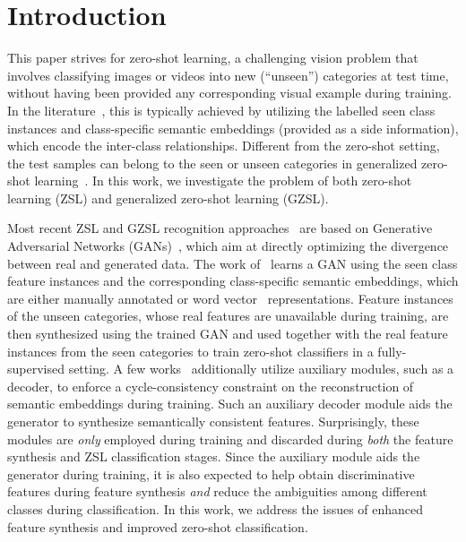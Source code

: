 \documentclass[runningheads]{llncs}
\begin{document}
\section{Introduction}


This paper strives for zero-shot learning, a challenging vision problem that involves classifying images or videos into new (\enquote{unseen}) categories at test time, without having been provided any corresponding visual example during training. In the literature~\cite{akata15label,romera15icml,Ye17cvpr,Xian18cvpr}, this is typically achieved by utilizing the labelled seen class instances and class-specific semantic embeddings (provided as a side information), which encode the inter-class relationships. Different from the zero-shot setting, the test samples can belong to the seen or unseen categories in generalized zero-shot learning~\cite{zsl-good-bad-ugly}. In this work, we investigate the problem of both zero-shot learning (ZSL) and generalized zero-shot learning (GZSL).


Most recent ZSL and GZSL recognition approaches~\cite{Xian18cvpr,Rafael18eccv,Xian19cvpr,huang19generative,li19leveraging} are based on Generative Adversarial Networks (GANs)~\cite{GAN}, which aim at directly optimizing the divergence between real and generated data. The work of~\cite{Xian18cvpr} learns a GAN using the seen class feature instances and the corresponding class-specific semantic embeddings, which are either manually annotated or word vector~\cite{mikolov13w2v} representations. 
Feature instances of the unseen categories, whose real features are unavailable during training, are then synthesized using the trained GAN and used together with the real feature instances from the seen categories to train zero-shot classifiers in a fully-supervised setting. 
A few works~\cite{Rafael18eccv,huang19generative,Mandal19cvpr} additionally utilize auxiliary modules, such as a decoder, to enforce a cycle-consistency constraint on the reconstruction of semantic embeddings during training. Such an auxiliary decoder module aids the generator to synthesize semantically consistent features.
Surprisingly, these modules are \textit{only} employed during training and discarded during \textit{both} the feature synthesis and ZSL classification stages. Since the auxiliary module aids the generator during training, it is also expected to help obtain discriminative features during feature synthesis \textit{and} reduce the ambiguities among different classes during classification. In this work, we address the issues of enhanced feature synthesis and improved zero-shot classification.
\end{document}

